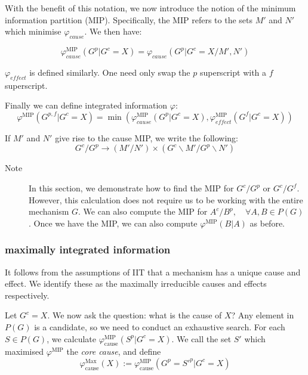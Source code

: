 With the benefit of this notation, we now introduce the notion of the minimum information partition (MIP). Specifically, the MIP refers to the sets $M'$ and $N'$ which minimise $\varphi_{cause}$. We then have:

\begin{equation}
\label{def:phi3}
\varphi^{\text{MIP}}_{cause}(G^p|G^c=X) = \varphi_{cause}(G^p|G^c=X/ M', N')
\end{equation}

$\varphi_{effect}$ is defined similarly. One need only swap the $p$ superscript with a $f$ superscript. 

Finally we can define integrated information $\varphi$:
\begin{equation}
\label{def:phi}
\varphi^{\text{MIP}}(G^{p,f}|G^c = X) = \min \left( \varphi^{\text{MIP}}_{cause}(G^p|G^c=X), \varphi^{\text{MIP}}_{effect}(G^f|G^c=X)  \right) 
\end{equation}



If $M'$ and $N'$ give rise to the cause MIP, we write the following:
\begin{equation}
\label{def:notation1}
G^c/G^p \rightarrow (M'/N') \times (G^c \backslash M'/ G^p\backslash N')
\end{equation}

\begin{description}
	\item[Note] In this section, we demonstrate how to find the MIP for $G^c/G^p$ or $G^c/G^f$. However, this calculation does not require us to be working with the entire mechanism $G$. We can also compute the MIP for $A^c/B^p, \quad \forall A,B \in P(G)$. Once we have the MIP, we can also compute $\varphi^{\text{MIP}}(B|A)$ as before.
\end{description}

\subsubsection{maximally integrated information}
It follows from the assumptions of IIT that a mechanism has a unique cause and effect. We identify these as the maximally irreducible causes and effects respectively. 

Let $G^c = X$. We now ask the question: what is the cause of $X$? Any element in $P(G)$ is a candidate, so we need to conduct an exhaustive search. For each $S \in P(G)$, we calculate $\varphi^{\text{MIP}}_{\text{cause}}(S^p|G^c=X)$. We call the set $S'$ which maximised $\varphi^{\text{MIP}}$ the \textit{core cause}, and define 
\begin{equation}
\label{def:core_cause}
\varphi^{\text{Max}}_{\text{cause}}(X):=\varphi^{\text{MIP}}_{\text{cause}}(G^p = S'^p|G^c = X)
\end{equation}

